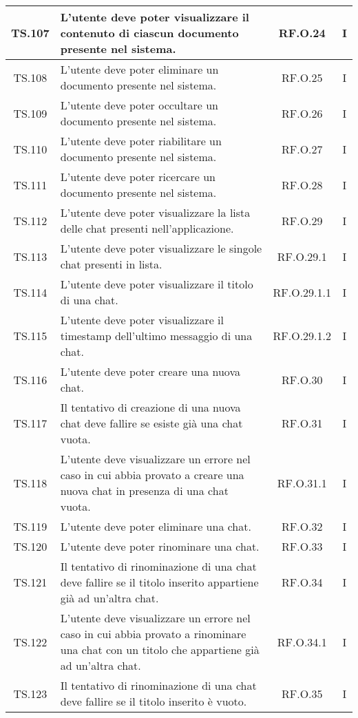 {{{{{{{{{{\begin{xltabular}{\textwidth}{|c|X|c|c|}
    \hline
    TS.107 & L’utente deve poter visualizzare il contenuto di ciascun documento presente nel sistema. & RF.O.24 & I \\
    \hline
    TS.108 & L’utente deve poter eliminare un documento presente nel sistema. & RF.O.25 & I \\
    \hline
    TS.109 & L’utente deve poter occultare un documento presente nel sistema. & RF.O.26 & I \\
    \hline
    TS.110 & L’utente deve poter riabilitare un documento presente nel sistema. & RF.O.27 & I \\
    \hline
    TS.111 & L’utente deve poter ricercare un documento presente nel sistema. & RF.O.28 & I \\
    \hline
    TS.112 & L’utente deve poter visualizzare la lista delle chat presenti nell’applicazione. & RF.O.29 & I \\
    \hline
    TS.113 & L’utente deve poter visualizzare le singole chat presenti in lista. & RF.O.29.1 & I \\
    \hline
    TS.114 & L’utente deve poter visualizzare il titolo di una chat. & RF.O.29.1.1 & I \\
    \hline
    TS.115 & L’utente deve poter visualizzare il timestamp dell’ultimo messaggio di una chat. & RF.O.29.1.2 & I \\
    \hline
    TS.116 & L’utente deve poter creare una nuova chat. & RF.O.30 & I \\
    \hline
    TS.117 & Il tentativo di creazione di una nuova chat deve fallire se esiste già una chat vuota. & RF.O.31 & I \\
    \hline
    TS.118 & L’utente deve visualizzare un errore nel caso in cui abbia provato a creare una nuova chat in presenza di una chat vuota. & RF.O.31.1 & I \\
    \hline
    TS.119 & L’utente deve poter eliminare una chat. & RF.O.32 & I \\
    \hline
    TS.120 & L’utente deve poter rinominare una chat. & RF.O.33 & I \\
    \hline
    TS.121 & Il tentativo di rinominazione di una chat deve fallire se il titolo inserito appartiene già ad un’altra chat. & RF.O.34 & I \\
    \hline
    TS.122 & L’utente deve visualizzare un errore nel caso in cui abbia provato a rinominare una chat con un titolo che appartiene già ad un’altra chat. & RF.O.34.1 & I \\
    \hline
    TS.123 & Il tentativo di rinominazione di una chat deve fallire se il titolo inserito è vuoto. & RF.O.35 & I \\

\end{xltabular}}}}}}}}}}}
